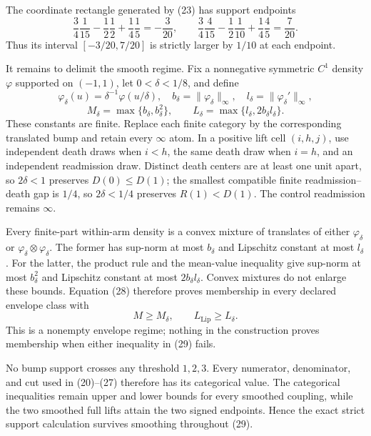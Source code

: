 The coordinate rectangle generated by (23) has support endpoints
\[
\frac34\frac1{15}-\frac12\frac12+\frac14\frac15=-\frac3{20},
\qquad
\frac34\frac4{15}-\frac12\frac1{10}+\frac14\frac45=\frac7{20}.
\]
Thus its interval \([-3/20,7/20]\) is strictly larger by \(1/10\) at each endpoint.

It remains to delimit the smooth regime.  Fix a nonnegative symmetric \(C^1\) density \(\varphi\) supported on \((-1,1)\), let \(0<\delta<1/8\), and define
\[
\varphi_\delta(u)=\delta^{-1}\varphi(u/\delta),\quad
b_\delta=\|\varphi_\delta\|_\infty,
\quad l_\delta=\|\varphi_\delta'\|_\infty,
\]
\[
M_\delta=\max\{b_\delta,b_\delta^2\},
\qquad
L_\delta=\max\{l_\delta,2b_\delta l_\delta\}.                     \tag{28}
\]
These constants are finite.  Replace each finite category by the corresponding translated bump and retain every \(\infty\) atom.  In a positive lift cell \((i,h,j)\), use independent death draws when \(i<h\), the same death draw when \(i=h\), and an independent readmission draw.  Distinct death centers are at least one unit apart, so \(2\delta<1\) preserves \(D(0)\leq D(1)\); the smallest compatible finite readmission--death gap is \(1/4\), so \(2\delta<1/4\) preserves \(R(1)<D(1)\).  The control readmission remains \(\infty\).

Every finite-part within-arm density is a convex mixture of translates of either \(\varphi_\delta\) or \(\varphi_\delta\otimes\varphi_\delta\).  The former has sup-norm at most \(b_\delta\) and Lipschitz constant at most \(l_\delta\).  For the latter, the product rule and the mean-value inequality give sup-norm at most \(b_\delta^2\) and Lipschitz constant at most \(2b_\delta l_\delta\).  Convex mixtures do not enlarge these bounds.  Equation (28) therefore proves membership in every declared envelope class with
\[
M\geq M_\delta,
\qquad L_{\mathrm{Lip}}\geq L_\delta.                                \tag{29}
\]
This is a nonempty envelope regime; nothing in the construction proves membership when either inequality in (29) fails.

No bump support crosses any threshold \(1,2,3\).  Every numerator, denominator, and cut used in (20)--(27) therefore has its categorical value.  The categorical inequalities remain upper and lower bounds for every smoothed coupling, while the two smoothed full lifts attain the two signed endpoints.  Hence the exact strict support calculation survives smoothing throughout (29).

